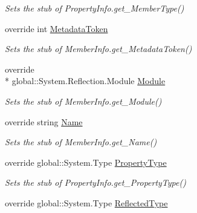 \begin{DoxyCompactItemize}
\begin{DoxyCompactList}\small\item\em Sets the stub of Property\-Info.\-get\-\_\-\-Member\-Type()\end{DoxyCompactList}\item 
override int \hyperlink{class_system_1_1_reflection_1_1_fakes_1_1_stub_property_info_a1a184836a6106f049d8f5319e290faff}{Metadata\-Token}
\begin{DoxyCompactList}\small\item\em Sets the stub of Member\-Info.\-get\-\_\-\-Metadata\-Token()\end{DoxyCompactList}\item 
override \\*
global\-::\-System.\-Reflection.\-Module \hyperlink{class_system_1_1_reflection_1_1_fakes_1_1_stub_property_info_a48f513b5e71c1c950103005de87b2d2a}{Module}
\begin{DoxyCompactList}\small\item\em Sets the stub of Member\-Info.\-get\-\_\-\-Module()\end{DoxyCompactList}\item 
override string \hyperlink{class_system_1_1_reflection_1_1_fakes_1_1_stub_property_info_abcbce73409715f6b8bb3a94b01a93694}{Name}
\begin{DoxyCompactList}\small\item\em Sets the stub of Member\-Info.\-get\-\_\-\-Name()\end{DoxyCompactList}\item 
override global\-::\-System.\-Type \hyperlink{class_system_1_1_reflection_1_1_fakes_1_1_stub_property_info_a53f2526f53f88e939ce448dee0ec2de4}{Property\-Type}
\begin{DoxyCompactList}\small\item\em Sets the stub of Property\-Info.\-get\-\_\-\-Property\-Type()\end{DoxyCompactList}\item 
override global\-::\-System.\-Type \hyperlink{class_system_1_1_reflection_1_1_fakes_1_1_stub_property_info_a0fb2e804b0dcf8435fbf1a1565493ba7}{Reflected\-Type}

\end{DoxyCompactItemize}
